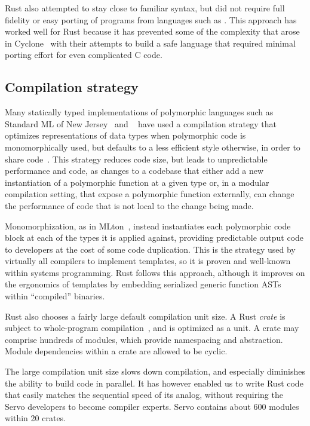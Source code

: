 Rust also attempted to stay close to familiar syntax, but did not require full fidelity or easy porting of
programs from languages such as \Cplusplus{}.
This approach has worked well for Rust because it has prevented some of the complexity that arose in
Cyclone~\cite{cyclone} with their attempts to build a safe language that required minimal porting effort
for even complicated C code.

\subsection{Compilation strategy}
Many statically typed implementations of polymorphic languages such as Standard ML of New Jersey~\cite{SMLNJ} and
\ocaml{}~\cite{ocaml-manual-3.0} have used a compilation strategy that optimizes representations of data types when
polymorphic code is monomorphically used, but defaults to a less efficient style otherwise, in order to share
code~\cite{ocaml-repr}.
This strategy reduces code size, but leads to unpredictable performance and code, as changes to a codebase that
either add a new instantiation of a polymorphic function at a given type or, in a modular compilation setting, that
expose a polymorphic function externally, can change the performance of code that is not local to the change being
made.

Monomorphization, as in MLton~\cite{mlton-compiler}, instead instantiates each polymorphic code block at each of the types
it is applied against, providing predictable output code to developers at the cost of some code duplication.
This is the strategy used by virtually all \Cplusplus{} compilers to implement templates, so it is proven and well-known
within systems programming. Rust follows this approach, although it improves on the ergonomics of \Cplusplus{} templates
by embedding serialized generic function ASTs within ``compiled'' binaries.

Rust also chooses a fairly large default compilation unit size. A Rust \textit{crate} is subject to whole-program
compilation~\cite{weeks:whole-program-mlton}, and is optimized as a unit. A crate may comprise hundreds of modules,
which provide namespacing and abstraction. Module dependencies within a crate are allowed to be cyclic.

The large compilation unit size slows down compilation, and especially diminishes the ability to build code in parallel. It has however enabled us to write Rust code that easily matches the sequential speed of its \Cplusplus{} analog, without requiring the Servo developers to become compiler experts. Servo contains about 600 modules within 20 crates.

